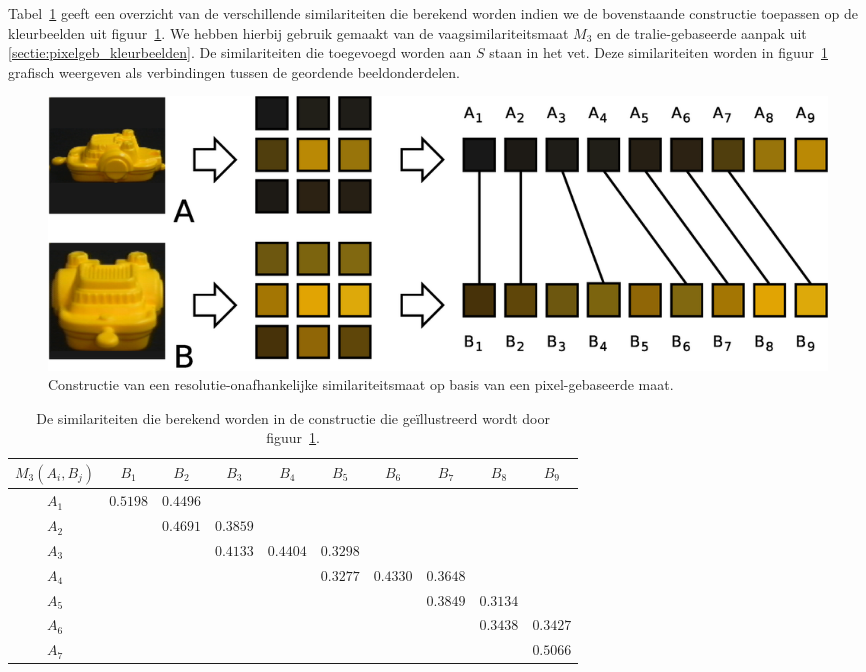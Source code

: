 Tabel~\ref{tab:multires} geeft een overzicht van de 
verschillende similariteiten die berekend worden indien we de bovenstaande constructie
toepassen op de kleurbeelden uit figuur~\ref{fig:multires}. We hebben hierbij gebruik gemaakt 
van de vaagsimilariteitsmaat $M_3$ en de tralie-gebaseerde aanpak uit \ref{sectie:pixelgeb_kleurbeelden}.
De similariteiten die  
toegevoegd worden aan $S$ staan in het vet. Deze similariteiten 
worden in figuur~\ref{fig:multires} grafisch weergeven als verbindingen tussen de
geordende beeldonderdelen.

\begin{figure}[tbp]
\begin{center}
\includegraphics[width=\textwidth]{images/multires.eps}
\caption{\label{fig:multires}Constructie van een resolutie-onafhankelijke similariteitsmaat op basis van een pixel-gebaseerde maat.}
\end{center}
\end{figure}
\begin{table}
\begin{center}
\begin{tabular}{|c|ccccccccc|}
\hline
$\scriptstyle M_3(A_i,B_j)$	& $B_1$ & $B_2$ & $B_3$ & $B_4$ & $B_5$ & $B_6$ & $B_7$ & $B_8$ & $B_9$  \\
\hline
$A_1$ 	& $\mathbf{\scriptstyle 0.5198}$ & $\scriptstyle 0.4496$ & & & & & & & \\
$A_2$ 	& & $\mathbf{\scriptstyle 0.4691}$ & $\scriptstyle 0.3859$ & & & & & & \\
$A_3$ 	& & & $\scriptstyle 0.4133$ & $\mathbf{\scriptstyle 0.4404}$ & $\scriptstyle 0.3298$ & & & & \\
$A_4$ 	& & & & & $\scriptstyle 0.3277$ & $\mathbf{\scriptstyle 0.4330}$ & $\scriptstyle 0.3648$ & & \\
$A_5$ 	& & & & & & & $\mathbf{\scriptstyle 0.3849}$ & $\scriptstyle 0.3134$ & \\
$A_6$ 	& & & & & & & & $\mathbf{\scriptstyle 0.3438}$ & $\scriptstyle 0.3427$ \\
$A_7$ 	& & & & & & & & & $\mathbf{\scriptstyle 0.5066}$ \\
\hline
\end{tabular}
\caption{\label{tab:multires}De similariteiten die berekend worden in de constructie die ge\"illustreerd wordt door figuur~\ref{fig:multires}.}
\end{center}
\end{table}

